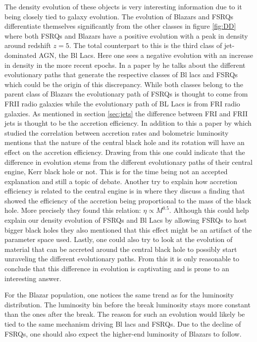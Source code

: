The density evolution of these objects is very interesting information due to it being closely tied to galaxy evolution. The evolution of Blazars and FSRQs differentiate themselves significantly from the other classes in figure \ref*{fig:DD}
where both FSRQs and Blazars have a positive evolution with a peak in density around redshift $z=5$. The total counterpart to this is the third class of jet-dominated AGN, the Bl Lacs. Here one sees a negative evolution with 
an increase in density in the more recent epochs. In a paper by \cite{Garofalo_2019} he talks about the different evolutionary paths that generate the respective classes of Bl lacs and FSRQs which could be the origin of this discrepancy. 
While both classes belong to the parent class of Blazars the evolutionary path of FSRQs is thought to come from FRII radio galaxies while the evolutionary path of BL Lacs is from FRI radio galaxies. As mentioned in section \ref*{sec:jets} the difference between FRI and FRII jets is thought to be the accretion efficiency. 
In addition to this a paper by \cite{Wei-Hao_2003} which studied the correlation between accretion rates and bolometric luminosity mentions that the nature of the central black hole and its rotation will have an effect on the accretion efficiency. Drawing from this one could indicate that the difference in evolution stems from the different evolutionary paths of their central engine, Kerr black hole or not.  
This is for the time being not an accepted explanation and still a topic of debate. 
Another try to explain how accretion efficiency is related to the central engine is in \cite{Raimundo_2012} where they discuss a finding that showed the efficiency of the accretion being proportional to the mass of the black hole.  
More precisely they found this relation: $\eta \propto M^{0.5}$. Although this could help explain our density evolution of FSRQs and Bl Lacs by allowing FSRQs to host bigger black holes they also mentioned that this effect might be an artifact of the parameter space used. 
Lastly, one could also try to look at the evolution of material that can be accreted around the central black hole to possibly start unraveling the different evolutionary paths.
From this it is only reasonable to conclude that this difference in evolution is captivating and is prone to an interesting answer. 


For the Blazar population, one notices the same trend as for the luminosity distribution. The luminosity bin before the break luminosity stays more constant than the ones after the break. The reason for such an evolution 
would likely be tied to the same mechanism driving Bl lacs and FSRQs. Due to the decline of FSRQs, one should also expect the
higher-end luminosity of Blazars to follow.

